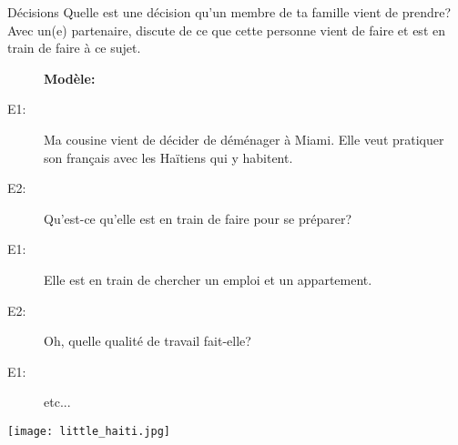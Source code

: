 \begin{frame}{Décisions}
  Quelle est une décision qu'un membre de ta famille \alert{vient de} prendre?
  Avec un(e) partenaire, discute de ce que cette personne vient de faire et \alert{est en train de} faire à ce sujet.
  \begin{description}
    \item[] \textbf{Modèle:}
    \item[E1:] Ma cousine \alert{vient de} décider de déménager à Miami. Elle veut pratiquer son français avec les Haïtiens qui y habitent.
    \item[E2:] Qu'est-ce qu'elle \alert{est en train de} faire pour se préparer?
    \item[E1:] Elle \alert{est en train de} chercher un emploi et un appartement.
    \item[E2:] Oh, quelle qualité de travail fait-elle?
    \item[E1:] etc...
  \end{description}
  \begin{center}
    \texttt{[image: little\_haiti.jpg]}
  \end{center}
\end{frame}